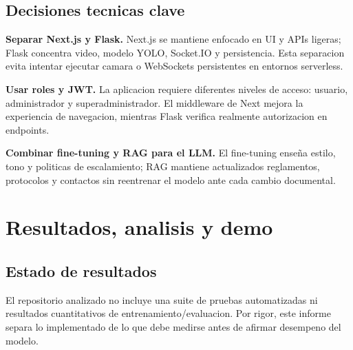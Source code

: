 \documentclass[11pt,letterpaper]{article}
\begin{document}
\subsection{Decisiones tecnicas clave}

\begin{decision}
\textbf{Separar Next.js y Flask.} Next.js se mantiene enfocado en UI y APIs ligeras; Flask concentra video, modelo YOLO, Socket.IO y persistencia. Esta separacion evita intentar ejecutar camara o WebSockets persistentes en entornos serverless.
\end{decision}

\begin{decision}
\textbf{Usar roles y JWT.} La aplicacion requiere diferentes niveles de acceso: usuario, administrador y superadministrador. El middleware de Next mejora la experiencia de navegacion, mientras Flask verifica realmente autorizacion en endpoints.
\end{decision}

\begin{decision}
\textbf{Combinar fine-tuning y RAG para el LLM.} El fine-tuning enseña estilo, tono y politicas de escalamiento; RAG mantiene actualizados reglamentos, protocolos y contactos sin reentrenar el modelo ante cada cambio documental.
\end{decision}

\section{Resultados, analisis y demo}

\subsection{Estado de resultados}

El repositorio analizado no incluye una suite de pruebas automatizadas ni resultados cuantitativos de entrenamiento/evaluacion. Por rigor, este informe separa lo implementado de lo que debe medirse antes de afirmar desempeno del modelo.
\end{document}
